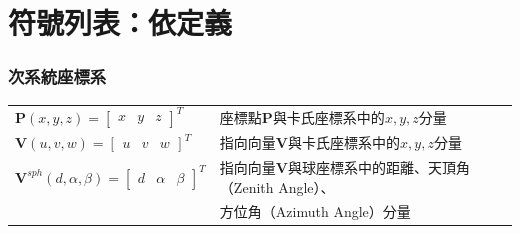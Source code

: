 \chapter*{符號列表：依定義}
\label{chp:symbol}




\subsection*{次系統座標系}

\begin{longtable}[l]{ll}
    $\boldsymbol{P}(x,y,z) =
        \left[\begin{array}{ccc}
        x &y&z
        \end{array}\right]^T $ & 座標點$\boldsymbol{P}$與卡氏座標系中的$x,y,z$分量\\
    $\boldsymbol{V}(u,v,w) =
        \left[\begin{array}{ccc}
        u &v&w
        \end{array}\right]^T$ & 指向向量$\boldsymbol{V}$與卡氏座標系中的$x,y,z$分量\\
   $\boldsymbol{V}^{sph}(d,\alpha,\beta) =
        \left[\begin{array}{ccc}
        d &\alpha&\beta
        \end{array}\right]^T$ & 指向向量$\boldsymbol{V}$與球座標系中的距離、天頂角（Zenith Angle）、\\
        &方位角（Azimuth Angle）分量\\
\end{longtable}





